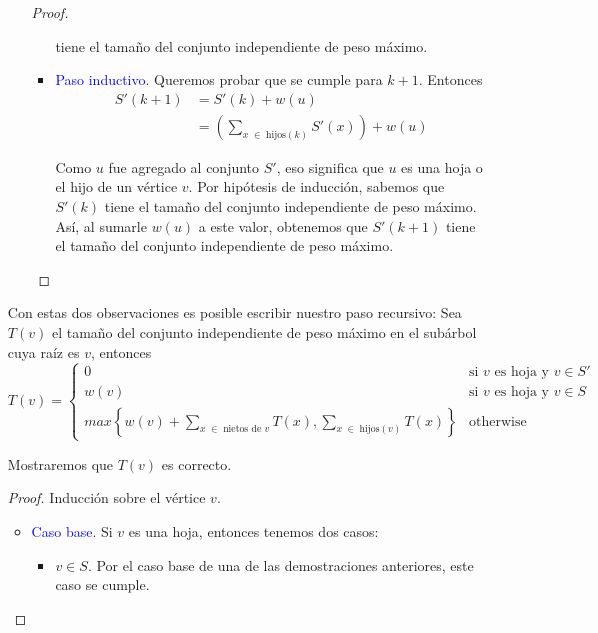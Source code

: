 \documentclass[letterpaper,11pt]{article}
\begin{document}
\begin{enumerate}
\begin{itemize}
\begin{proof}
\begin{itemize}
                tiene el tamaño del conjunto independiente de peso máximo. 

                \item \textcolor{blue}{Paso inductivo}. Queremos probar que se 
                cumple para $k+1$. Entonces 
                \begin{align*}
                    S'(k+1)
                    &= S'(k) + w(u) \\
                    &= \left(\sum_{x \; \in \; \text{hijos}(k)} S'(x)\right) 
                    + w(u)
                \end{align*}

                Como $u$ fue agregado al conjunto $S'$, eso significa que $u$ 
                es una hoja o el hijo de un vértice $v$. Por hipótesis de 
                inducción, sabemos que $S'(k)$ tiene el tamaño del conjunto 
                independiente de peso máximo. Así, al sumarle $w(u)$ a este 
                valor, obtenemos que $S'(k+1)$ tiene el tamaño del conjunto 
                independiente de peso máximo.
            \end{itemize}
        \end{proof}
        
    \end{itemize} 

    Con estas dos observaciones es posible escribir nuestro paso recursivo: Sea 
    $T(v)$ el tamaño del conjunto independiente de peso máximo en el subárbol 
    cuya raíz es $v$, entonces 
    \begin{equation*}
        T(v) = 
        \begin{cases}
            0 & \text{si $v$ es hoja y $v \in S'$} \\
            w(v) & \text{si $v$ es hoja y $v \in S$} \\
            max \left\{w(v) + \sum_{x \; \in \; \text{nietos de $v$}} 
            T(x), \sum_{x \; \in \; \text{hijos}(v)} T(x)\right\} 
            & \text{otherwise}
        \end{cases}
    \end{equation*}

    Mostraremos que $T(v)$ es correcto.
    \begin{proof}
        Inducción sobre el vértice $v$. 
        \begin{itemize}
            \item \textcolor{blue}{Caso base}. Si $v$ es una hoja, entonces 
            tenemos dos casos:
            \begin{itemize}
                \item $v \in S$. Por el caso base de una de las demostraciones 
                anteriores, este caso se cumple.


\end{itemize}
\end{itemize}
\end{proof}
\end{enumerate}
\end{document}
